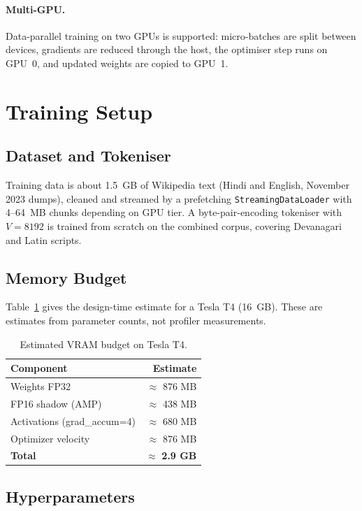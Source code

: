 \documentclass[11pt,a4paper]{article}
\begin{document}
\paragraph{Multi-GPU.}
Data-parallel training on two GPUs is supported: micro-batches are split
between devices, gradients are reduced through the host, the optimiser
step runs on GPU~0, and updated weights are copied to GPU~1.

\section{Training Setup}
\label{sec:training}

\subsection{Dataset and Tokeniser}
Training data is about 1.5~GB of Wikipedia text (Hindi and English,
November 2023 dumps), cleaned and streamed by a prefetching
\texttt{StreamingDataLoader} with 4--64~MB chunks depending on GPU tier.
A byte-pair-encoding tokeniser with $V=8192$ is trained from scratch on
the combined corpus, covering Devanagari and Latin scripts.

\subsection{Memory Budget}
Table~\ref{tab:vram} gives the design-time estimate for a Tesla T4
(16~GB). These are estimates from parameter counts, not profiler
measurements.

\begin{table}[htbp]
\centering
\caption{Estimated VRAM budget on Tesla T4.}
\label{tab:vram}
\begin{tabular}{lr}
\toprule
\textbf{Component} & \textbf{Estimate}\\
\midrule
Weights FP32       & $\approx$ 876 MB\\
FP16 shadow (AMP)  & $\approx$ 438 MB\\
Activations (grad\_accum=4) & $\approx$ 680 MB\\
Optimizer velocity & $\approx$ 876 MB\\
\midrule
\textbf{Total}     & $\approx$ \textbf{2.9 GB}\\
\bottomrule
\end{tabular}
\end{table}

\subsection{Hyperparameters}
\end{document}
